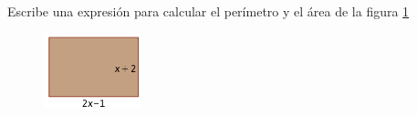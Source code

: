 \question[10] Escribe una expresión para calcular el perímetro y el área de la figura \ref{fig:20230319035140}

\begin{figure}[H]
    \centering
    \includegraphics[width=0.25\textwidth]{../images/20230319035140}
    \caption{}
    \label{fig:20230319035140}
\end{figure}
